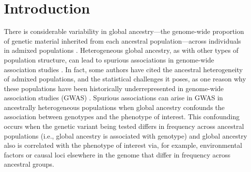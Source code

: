 \documentclass[12pt]{article}
\begin{document}
\newpage
\section{Introduction}



There is considerable variability in global ancestry---the genome-wide proportion of genetic material inherited from each ancestral population---across individuals in admixed populations \citep{parra1998, tishkoff2009, bryc2010aa, bryc2010hl, conomos2016}.
Heterogeneous global ancestry, as with other types of population structure, can lead to spurious associations in genome-wide association studies \citep{GenomicControl, eigenstrat, marchini2004, price2010}. 
In fact, some authors have cited the ancestral heterogeneity of admixed populations, and the statistical challenges it poses, as one reason why these populations have been historically underrepresented in genome-wide association studies (GWAS) \citep{need2009, bustamante2011, popejoy2016, hindorff2018, manolio2019}.
Spurious associations can arise in GWAS in ancestrally heterogeneous populations when global ancestry confounds the association between genotypes and the phenotype of interest. %
This confounding occurs when the genetic variant being tested differs in frequency across ancestral populations (i.e., global ancestry is associated with genotype) and global ancestry also is correlated with the phenotype of interest via, for example, environmental factors or causal loci elsewhere in the genome that differ in frequency across ancestral groups.

\end{document}
